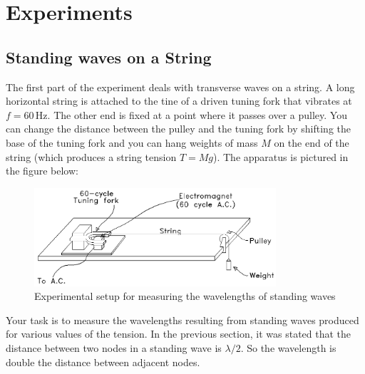 \section{Experiments}
\subsection{Standing waves on a String}
The first part of the experiment deals with transverse waves on a string. A long horizontal string is attached to the tine of a driven tuning fork that vibrates at $f = 60\, \textrm{Hz}$. The other end is fixed at a point where it passes over a pulley. You can change the distance between the pulley and the tuning fork by shifting the base of the tuning fork and you can hang weights of mass $M$ on the end of the string (which produces a string tension $T=Mg$). The apparatus is pictured in the figure below:\myskip
\begin{figure}[h]
\centering
\includegraphics[width=0.8\textwidth]{./Exp8/pic/image4.png}
\caption{Experimental setup for measuring the wavelengths of standing waves}
\end{figure} 

Your task is to measure the wavelengths resulting from standing waves produced for various values of the tension. In the previous section, it was stated that the distance between two nodes in a standing wave is $\lambda/2$. So the wavelength is double the distance between adjacent nodes.\myskip

